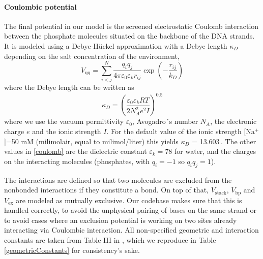 \paragraph{Coulombic potential} The final potential in our model is the screened electrostatic Coulomb interaction between the phosphate molecules situated on the backbone of the DNA strands. It is modeled using a Debye-H\"uckel approximation with a Debye length $\kappa_D$ depending on the salt concentration of the environment,
\begin{equation}
V_\text{qq} =\sum_{i<j}^N  \frac{q_i q_j}{4\pi \varepsilon_0 \varepsilon_k r_{ij}} \exp \left(- \frac{r_{ij}}{k_D}  \right)
\label{coulomb}\end{equation}
where the Debye length can be written as
\begin{equation}
\kappa_D = \left( \frac{\varepsilon_0 \varepsilon_k RT}{2N^2_A e^2 I} \right)^{0.5}
\end{equation}
where we use the vacuum permittivity $\varepsilon_0$, Avogadro´s number $N_A$, the electronic charge $e$ and the ionic strength $I$. For the default value of the ionic strength [Na$^+$]=50 mM (milimolair, equal to milimol/liter) this yields $\kappa_D$ = 13.603\,\Angstrom. The other values in \ref{coulomb} are the dielectric constant $\varepsilon_k = 78$ for water, and the charges on the interacting molecules (phosphates, with $q_i = -1$ so $q_i q_j = 1$).

The interactions are defined so that two molecules are excluded from the nonbonded interactions if they constitute a bond. On top of that, $V_\text{stack}$, $V_\text{bp}$ and $V_\text{ex}$ are modeled as mutually exclusive. Our codebase makes sure that this is handled correctly, to avoid the unphysical pairing of bases on the same strand or to avoid cases where an exclusion potential is working on two sites already interacting via Coulombic interaction. All non-specified geometric and interaction constants are taken from Table III in \cite{knotts2007coarse}, which we reproduce in Table \ref{geometricConstants} for consistency's sake.


